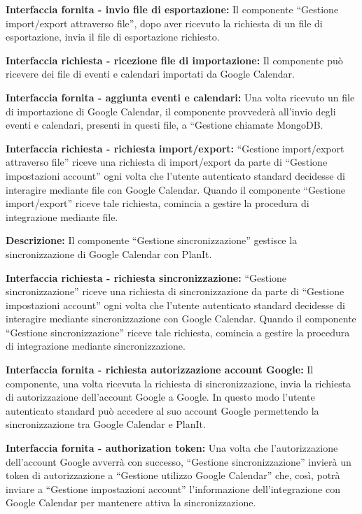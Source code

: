 \begin{listaPersonale}[DCI]{}
    \textbf{Interfaccia fornita - invio file di esportazione:} Il componente “Gestione import/export attraverso file”, dopo aver ricevuto la richiesta di un file di esportazione, invia il file di esportazione richiesto.

    \textbf{Interfaccia richiesta - ricezione file di importazione:} Il componente può ricevere dei file di eventi e calendari importati da Google Calendar.

    \textbf{Interfaccia fornita - aggiunta eventi e calendari:} Una volta ricevuto un file di importazione di Google Calendar, il componente provvederà all'invio degli eventi e calendari, presenti in questi file, a “Gestione chiamate MongoDB.

    \textbf{Interfaccia richiesta - richiesta import/export:} “Gestione import/export attraverso file” riceve una richiesta di import/export da parte di “Gestione impostazioni account” ogni volta che l'utente autenticato standard decidesse di interagire mediante file con Google Calendar. Quando il componente “Gestione import/export” riceve tale richiesta, comincia a gestire la procedura di integrazione mediante file.



    \textbf{Descrizione:}   Il componente “Gestione sincronizzazione” gestisce la sincronizzazione di Google Calendar con PlanIt.

    \textbf{Interfaccia richiesta - richiesta sincronizzazione:} “Gestione sincronizzazione” riceve una richiesta di sincronizzazione da parte di “Gestione impostazioni account” ogni volta che l'utente autenticato standard decidesse di interagire mediante sincronizzazione con Google Calendar. Quando il componente “Gestione sincronizzazione” riceve tale richiesta, comincia a gestire la procedura di integrazione mediante sincronizzazione.

    \textbf{Interfaccia fornita - richiesta autorizzazione account Google:} Il componente, una volta ricevuta la richiesta di sincronizzazione, invia la richiesta di autorizzazione dell'account Google a Google. In questo modo l'utente autenticato standard può accedere al suo account Google permettendo la sincronizzazione tra Google Calendar e PlanIt.

    \textbf{Interfaccia fornita - authorization token:} Una volta che l'autorizzazione dell'account Google avverrà con successo, “Gestione sincronizzazione” invierà un token di autorizzazione a “Gestione utilizzo Google Calendar” che, così, potrà inviare a “Gestione impostazioni account” l'informazione dell'integrazione con Google Calendar per mantenere attiva la sincronizzazione.



\end{listaPersonale}
